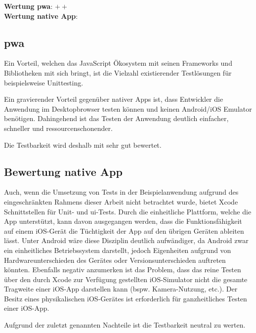 \textbf{Wertung \ac{pwa}}: $++$\\
\textbf{Wertung native App}: \Circle \\

\subsection{\ac{pwa}}
Ein Vorteil, welchen das JavaScript Ökosystem mit seinen Frameworks und Bibliotheken mit sich bringt, ist die Vielzahl existierender Testlösungen für beispielsweise Unittesting.

Ein gravierender Vorteil gegenüber nativer Apps ist, dass Entwickler die Anwendung im Desktopbrowser testen können und keinen Android/iOS Emulator benötigen. Dahingehend ist das Testen der Anwendung deutlich einfacher, schneller und ressourcenschonender.

Die Testbarkeit wird deshalb mit sehr gut bewertet.

\subsection{Bewertung native App}
Auch, wenn die Umsetzung von Tests in der Beispielanwendung aufgrund des eingeschränkten Rahmens dieser Arbeit nicht betrachtet wurde, bietet Xcode Schnittstellen für Unit- und \ac{ui}-Tests. Durch die einheitliche Plattform, welche die App unterstützt, kann davon ausgegangen werden, dass die Funktionsfähigkeit auf einem iOS-Gerät die Tüchtigkeit der App auf den übrigen Geräten ableiten lässt. Unter Android wäre diese Disziplin deutlich aufwändiger, da Android zwar ein einheitliches Betriebssystem darstellt, jedoch Eigenheiten aufgrund von Hardwareunterschieden des Gerätes oder Versionsunterschieden auftreten könnten. Ebenfalls negativ anzumerken ist das Problem, dass das reine Testen über den durch Xcode zur Verfügung gestellten iOS-Simulator nicht die gesamte Tragweite einer iOS-App darstellen kann (bspw. Kamera-Nutzung, etc.). Der Besitz eines physikalischen iOS-Gerätes ist erforderlich für ganzheitliches Testen einer iOS-App.

Aufgrund der zuletzt genannten Nachteile ist die Testbarkeit neutral zu werten.